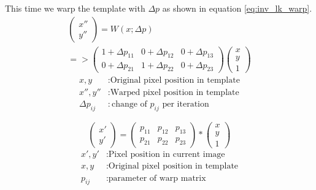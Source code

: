 \documentclass[11pt,a4paper,titlepage,oneside]{report}
\begin{document}
This time we warp the template with $\Delta p$ as shown in equation \ref{eq:inv_lk_warp}. 
\begin{equation}\label{eq:inv_lk_warp}
  \begin{gathered}
    \begin{pmatrix}
      x'' \\
      y''
    \end{pmatrix}=
    W(x;\Delta p)\\
    =>\begin{pmatrix}
      1 + \Delta p_{11} & 0 + \Delta p_{12} & 0 + \Delta p_{13} \\
      0 + \Delta p_{21} & 1 + \Delta p_{22} & 0 + \Delta p_{23}
    \end{pmatrix}
    \begin{pmatrix}
      x\\
      y\\
      1
    \end{pmatrix}
  \end{gathered}
\end{equation}
\begin{align*}
  x,y            &:  \text{Original pixel position in template}\\
  x'',y''        &:  \text{Warped pixel position in template}\\
  \Delta p_{ij}  &:  \text{change of $p_{ij}$ per iteration}
\end{align*}

\begin{equation}
  \begin{pmatrix}
    x' \\
    y'
  \end{pmatrix}=
  \begin{pmatrix}
    p_{11} & p_{12} & p_{13} \\
    p_{21} & p_{22} & p_{23}
  \end{pmatrix}*
  \begin{pmatrix}
    x\\
    y\\
    1
  \end{pmatrix}
\end{equation}
\begin{align*}
  x',y'          &:  \text{Pixel position in current image}\\
  x,y            &:  \text{Original pixel position in template}\\
  p_{ij}        &:  \text{parameter of warp matrix}\\
\end{align*}
\end{document}
